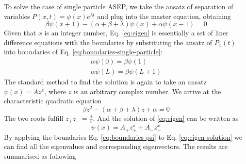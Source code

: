 \documentclass[12pt,a4paper]{article}
\begin{document}
To solve the case of single particle ASEP, we take the ansatz of separation of
variables $P(x,t) = \psi(x)e^{\lambda t}$ and plug into the master equation,
obtaining 
\begin{equation}
    \label{eq:eigen}
    \beta\psi(x+1) -(\alpha+\beta+\lambda)\psi(x) + \alpha\psi(x-1) = 0
\end{equation}
Given that $x$ is an integer number, Eq. \eqref{eq:eigen} is essentially a set
of liner difference equations with the boundaries by substituting the ansatz of
$P_x(t)$ into boundaries of Eq. \eqref{eq:boundaries-single-particle}: 
\begin{subequations}
    \label{eq:boundaries-psi}
\begin{eqnarray}
    \alpha\psi(0) = \beta\psi(1) \\
    \alpha \psi(L) = \beta \psi(L+1)
\end{eqnarray}
\end{subequations}
The standard method to find the solution is again to take an ansatz $\psi(x) =
Az^x$, where $z$ is an arbitrary complex number. We arrive at the characteristic
quadratic equation 
\begin{equation}
    \label{eq:characteristic}
    \beta z^2 - (\alpha + \beta + \lambda ) z + \alpha = 0
\end{equation}
The two roots fulfill $z_+z_- = \frac{\alpha}{\beta}$. And the solution of
\eqref{eq:eigen} can be written as 
\begin{equation}
    \label{eq:eigen-solution}
    \psi(x) = A_+ z_+^{x} + A_- z_-^{x}
\end{equation}
By applying the boundaries Eq. \eqref{eq:boundaries-psi} to Eq.
\eqref{eq:eigen-solution} we can find all the eigenvalues and corresponding
eigenvectors. The results are summarised as following
\end{document}
